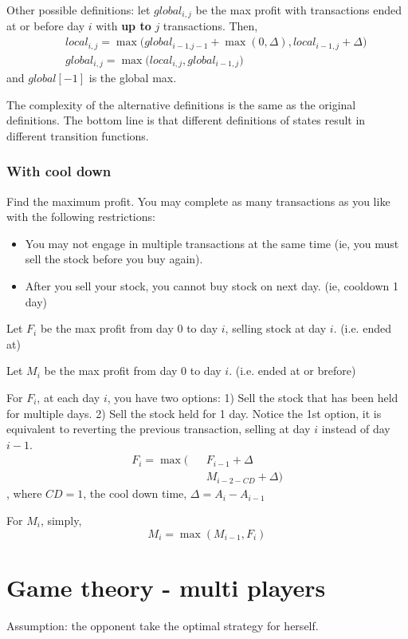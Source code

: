 Other possible definitions: let $global_{i, j}$ be the max profit
with transactions ended at or before day $i$ with \textbf{up to} $j$ transactions. Then, 
\begin{eqnarray*}
&& local_{i,j} = \max\Big(global_{i-1.j-1} + \max(0, \Delta), local_{i-1,j}+\Delta\Big)
\nonumber \\
&& global_{i,j} = \max\Big(local_{i, j}, global_{i-1,j}\Big)
\end{eqnarray*}
and $global[-1]$ is the global max. 

The complexity of the alternative definitions is the same as the original definitions. The bottom line is that different definitions of states result in different transition functions.
\subsubsection{With cool down}

Find the maximum profit. You may complete as many transactions as you like with the following restrictions:
\begin{itemize}
\item You may not engage in multiple transactions at the same time (ie, you must sell the stock before you buy again).
\item After you sell your stock, you cannot buy stock on next day. (ie, cooldown 1 day)
\end{itemize}

Let $F_i$ be the max profit from day 0 to day $i$, selling stock at day $i$. (i.e. ended at)

Let $M_i$ be the max profit from day 0 to day $i$. (i.e. ended at or brefore)

For $F_i$, at each day $i$, you have two options: 1) Sell the stock that has been held for multiple days. 2) Sell the stock held for 1 day.
Notice the 1st option, it is equivalent to reverting the previous transaction, selling at day $i$ instead of day $i-1$.
\begin{eqnarray*}
F_{i}= \max\big(&&F_{i-1}+\Delta \\
&&M_{i-2-CD}+\Delta \big)
\end{eqnarray*}
, where $CD=1$, the cool down time, $\Delta = A_i-A_{i-1}$ 

For $M_i$, simply, 
$$
M_i = \max(M_{i-1}, F_i)
$$


\section{Game theory - multi players}
Assumption: the opponent take the optimal strategy for herself. 

